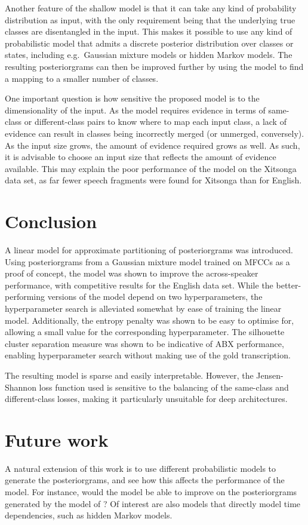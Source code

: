 Another feature of the shallow model is that it can take any kind of probability distribution as input, with the only requirement being that the underlying true classes are disentangled in the input.
This makes it possible to use any kind of probabilistic model that admits a discrete posterior distribution over classes or states, including e.g.\ Gaussian mixture models or hidden Markov models.
The resulting posteriorgrams can then be improved further by using the model to find a mapping to a smaller number of classes.

One important question is how sensitive the proposed model is to the dimensionality of the input.
As the model requires evidence in terms of same-class or different-class pairs to know where to map each input class, a lack of evidence can result in classes being incorrectly merged (or unmerged, conversely).
As the input size grows, the amount of evidence required grows as well.
As such, it is advisable to choose an input size that reflects the amount of evidence available.
This may explain the poor performance of the model on the Xitsonga data set, as far fewer speech fragments were found for Xitsonga than for English.

\section{Conclusion}
A linear model for approximate partitioning of posteriorgrams was introduced.
Using posteriorgrams from a Gaussian mixture model trained on MFCCs as a proof of concept, the model was shown to improve the across-speaker performance, with competitive results for the English data set.
While the better-performing versions of the model depend on two hyperparameters, the hyperparameter search is alleviated somewhat by ease of training the linear model.
Additionally, the entropy penalty was shown to be easy to optimise for, allowing a small value for the corresponding hyperparameter.
The silhouette cluster separation measure was shown to be indicative of ABX performance, enabling hyperparameter search without making use of the gold transcription.

The resulting model is sparse and easily interpretable.
However, the Jensen-Shannon loss function used is sensitive to the balancing of the same-class and different-class losses, making it particularly unsuitable for deep architectures.

\section{Future work}
A natural extension of this work is to use different probabilistic models to generate the posteriorgrams, and see how this affects the performance of the model.
For instance, would the model be able to improve on the posteriorgrams generated by the model of \textcite{chen2015parallel}?
Of interest are also models that directly model time dependencies, such as hidden Markov models.

